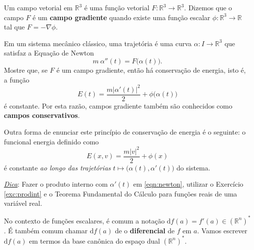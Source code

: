 \begin{exer}
	Um campo vetorial em $\mathbb{R}^3$ é uma função vetorial $F: \mathbb{R}^3 \to \mathbb{R}^3$. Dizemos que o campo $F$ é um \textbf{campo gradiente} quando existe uma função escalar $\phi: \mathbb{R}^3 \to \mathbb{R}$ tal que $F = - \nabla \phi$.
	
	Em um sistema mecânico clássico, uma trajetória é uma curva $\alpha: I \to \mathbb{R}^3$ que satisfaz a Equação de Newton
	\begin{equation}\label{eqn:newton}
	m \ \alpha''(t) = F \big(\alpha(t)\big).
	\end{equation} Mostre que, se $F$ é um campo gradiente, então há conservação de energia, isto é, a função
	\[
	E(t) = \frac{m |\alpha'(t)|^2}{2} + \phi \big(\alpha(t)\big)
	\] é constante. Por esta razão, campos gradiente também são conhecidos como \textbf{campos conservativos}.
	
	Outra forma de enunciar este princípio de conservação de energia é o seguinte: o funcional energia definido como
	\[
	E(x,v) = \frac{m|v|^2}{2} + \phi(x)
	\] é constante \textit{ao longo das trajetórias} $t \mapsto \big(\alpha(t), \alpha'(t)\big)$ do sistema.
	
	\underline{\textit{Dica}}: Fazer o produto interno com $\alpha'(t)$ em \eqref{eqn:newton}, utilizar o Exercício \ref{exc:prodint} e o Teorema Fundamental do Cálculo para funções reais de uma variável real.
\end{exer}


No contexto de funções escalares, é comum a notação $\mathrm{d}  f(a) = f'(a) \in (\mathbb{R}^n)^*$. É também comum chamar $\mathrm{d}  f(a)$ de o \textbf{diferencial} de $f$ em $a$. Vamos escrever $\mathrm{d}  f (a)$ em termos da base canônica do espaço dual $(\mathbb{R}^n)^*$.

